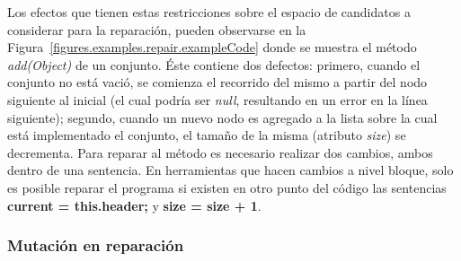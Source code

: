 Los efectos que tienen estas restricciones sobre el espacio de candidatos a considerar para la reparaci\'on, pueden observarse en la Figura~\ref{figures.examples.repair.exampleCode} donde se muestra el m\'etodo \emph{add(Object)} de un conjunto. \'Este contiene dos defectos: primero, cuando el conjunto no est\'a vaci\'o, se comienza el recorrido del mismo a partir del nodo siguiente al inicial (el cual podr\'ia ser \emph{null}, resultando en un error en la l\'inea siguiente); segundo, cuando un nuevo nodo es agregado a la lista sobre la cual est\'a implementado el conjunto, el tama\~no de la misma (atributo \emph{size}) se decrementa. Para reparar al m\'etodo es necesario realizar dos cambios, ambos dentro de una sentencia. En herramientas que hacen cambios a nivel bloque, solo es posible reparar el programa si existen en otro punto del c\'odigo las sentencias \textbf{current = this.header;} y \textbf{size = size + 1}.


\subsubsection{Mutaci\'on en reparaci\'on}
\label{sec:repair.granularity.mutation}

